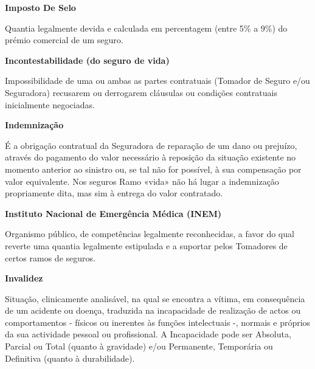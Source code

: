 \begin{description}
\item \textbf{Imposto De Selo}

Quantia legalmente devida e calculada em percentagem (entre 5\% a 9\%) do prémio comercial de um seguro.
\end{description}

\begin{description}
\item \textbf{Incontestabilidade (do seguro de vida)}

Impossibilidade de uma ou ambas as partes contratuais (Tomador de Seguro e/ou Seguradora) recusarem ou derrogarem cláusulas ou condições contratuais inicialmente negociadas.
\end{description}

\begin{description}
\item \textbf{Indemnização}

É a obrigação contratual da Seguradora de reparação de um dano ou prejuízo, através do pagamento do valor necessário à reposição da situação existente no momento anterior ao sinistro ou, se tal não for possível, à sua compensação por valor equivalente. Nos seguros Ramo «vida» não há lugar a indemnização propriamente dita, mas sim à entrega do valor contratado.
\end{description}

\begin{description}
\item \textbf{Instituto Nacional de Emergência Médica (INEM)}

Organismo público, de competências legalmente reconhecidas, a favor do qual reverte uma quantia legalmente estipulada e a suportar pelos Tomadores de certos ramos de seguros.
\end{description}

\begin{description}
\item \textbf{Invalidez}

Situação, clinicamente analisável, na qual se encontra a vítima, em consequência de um acidente ou doença, traduzida na incapacidade de realização de actos ou comportamentos - físicos ou inerentes às funções intelectuais -, normais e próprios da sua actividade pessoal ou profissional. A Incapacidade pode ser Absoluta, Parcial ou Total (quanto à gravidade) e/ou Permanente, Temporária ou Definitiva (quanto à durabilidade).
\end{description}

